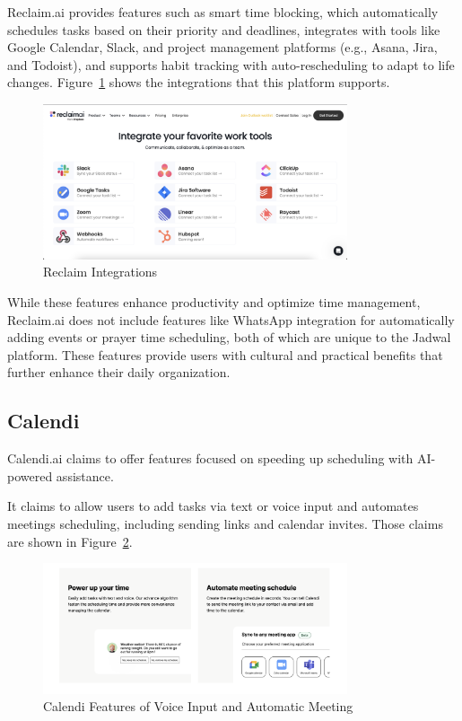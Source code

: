 \documentclass[12pt,a4paper,twoside]{report}
\begin{document}
Reclaim.ai provides features such as smart time blocking, which automatically schedules tasks based on their priority and deadlines, integrates with tools like Google Calendar, Slack, and project management platforms (e.g., Asana, Jira, and Todoist), and supports habit tracking with auto-rescheduling to adapt to life changes. Figure~\ref{fig:reclaim-integrations} shows the integrations that this platform supports.

\begin{figure}[!h]
    \centering
    \includegraphics[width=0.8\textwidth]{images/competitors/reclaim-integrations.png}
    \caption{Reclaim Integrations}
    \label{fig:reclaim-integrations}
\end{figure}

While these features enhance productivity and optimize time management, Reclaim.ai does not include features like WhatsApp integration for automatically adding events or prayer time scheduling, both of which are unique to the Jadwal platform. These features provide users with cultural and practical benefits that further enhance their daily organization.

\subsection{Calendi}

Calendi.ai claims to offer features focused on speeding up scheduling with AI-powered assistance.

It claims to allow users to add tasks via text or voice input and automates meetings scheduling, including sending links and calendar invites.
Those claims are shown in Figure~\ref{fig:calendi-feature-voice-input}.

\begin{figure}[!h]
    \centering
    \includegraphics[width=0.8\textwidth]{images/competitors/calendi-feature-voice-input.png}
    \caption{Calendi Features of Voice Input and Automatic Meeting}
    \label{fig:calendi-feature-voice-input}
\end{figure}
\end{document}

